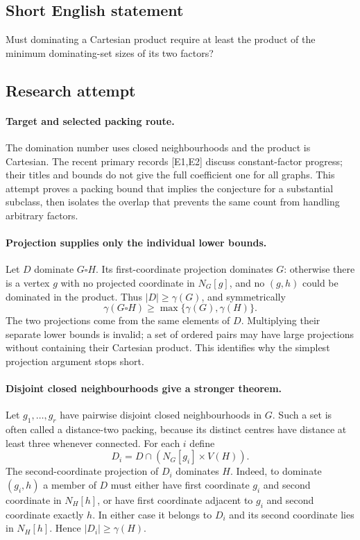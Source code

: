 \documentclass[11pt,a4paper]{article}
\begin{document}
\subsection{Short English statement}

Must dominating a Cartesian product require at least the product of the minimum dominating-set sizes of its two factors?

\subsection{Research attempt}

\paragraph{Target and selected packing route.}
The domination number uses closed neighbourhoods and the product is
Cartesian. The recent primary records [E1,E2] discuss constant-factor
progress; their titles and bounds do not give the full coefficient one
for all graphs. This attempt proves a packing bound that implies the
conjecture for a substantial subclass, then isolates the overlap that
prevents the same count from handling arbitrary factors.

\paragraph{Projection supplies only the individual lower bounds.}
Let $D$ dominate $G\square H$. Its first-coordinate projection
dominates $G$: otherwise there is a vertex $g$ with no projected
coordinate in $N_G[g]$, and no $(g,h)$ could be dominated in the
product. Thus $|D|\ge\gamma(G)$, and symmetrically
\[
                 \gamma(G\square H)\ge\max\{\gamma(G),\gamma(H)\}.
\]
The two projections come from the same elements of $D$. Multiplying
their separate lower bounds is invalid; a set of ordered pairs may
have large projections without containing their Cartesian product.
This identifies why the simplest projection argument stops short.

\paragraph{Disjoint closed neighbourhoods give a stronger theorem.}
Let $g_1,\ldots,g_r$ have pairwise disjoint closed neighbourhoods
in $G$. Such a set is often called a distance-two packing, because
its distinct centres have distance at least three whenever connected.
For each $i$ define
\[
            D_i=D\cap(N_G[g_i]\times V(H)).
\]
The second-coordinate projection of $D_i$ dominates $H$. Indeed,
to dominate $(g_i,h)$ a member of $D$ must either have first
coordinate $g_i$ and second coordinate in $N_H[h]$, or have first
coordinate adjacent to $g_i$ and second coordinate exactly $h$.
In either case it belongs to $D_i$ and its second coordinate lies
in $N_H[h]$. Hence $|D_i|\ge\gamma(H)$.
\end{document}
